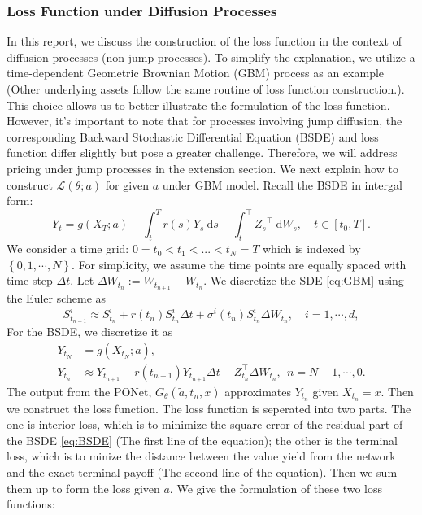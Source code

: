 \documentclass[11pt,a4paper]{article}
\theoremstyle{remark}
\begin{document}
	\subsubsection{Loss Function under Diffusion Processes}
	In this report, we discuss the construction of the loss function in the context of diffusion processes (non-jump processes). To simplify the explanation, we utilize a time-dependent Geometric Brownian Motion (GBM) process as an example (Other underlying assets follow the same routine of loss function construction.). This choice allows us to better illustrate the formulation of the loss function. However, it's important to note that for processes involving jump diffusion, the corresponding Backward Stochastic Differential Equation (BSDE) and loss function differ slightly but pose a greater challenge. Therefore, we will address pricing under jump processes in the extension section.
	We next explain how to construct $\mathcal{L}(\theta;a)$ for given $a$ under GBM model. Recall the BSDE in intergal form:
	\begin{equation}
		Y_t = g(X_T; a) - \int_t^T r(s) Y_s \mathrm{~d} s  - \int_t^{\top} {Z_s}^{\top} \mathrm{~d} W_s,\quad t\in[t_0,T].
	\end{equation}
	We consider a time grid: $0 = t_0 < t_1 < ... < t_{N}=T$ which is indexed by $\left\{0, 1, \cdots, N\right\}$. For simplicity, we assume the time points are equally spaced with time step $\Delta t$. Let $\Delta W_{t_n}:=W_{t_{n+1}}-W_{t_n}$. We discretize the SDE \eqref{eq:GBM} using the Euler scheme as
	\begin{equation}
		S_{t_{n+1}}^i \approx S_{t_n}^i + r(t_n) S_{t_n}^i \Delta t + \sigma^i(t_n) S_{t_n}^i\Delta W_{t_n},\quad i=1,\cdots,d, \label{eq:GBM-dist}
	\end{equation}
	For the BSDE, we discretize it as 
	\begin{align}\label{eq:dist-BSDE}
		Y_{t_N} & = g(X_{t_N}; a),  \\
		Y_{t_n} &\approx Y_{t_{n+1}} - r(t_{n+1}) Y_{t_{n+1}}\Delta t  -  Z_{t_n}^\top \Delta W_{t_n},\ \ n=N-1,\cdots,0. 
	\end{align}
	The output from the PONet, $G_\theta(\tilde{a},t_n,x)$ approximates $Y_{t_n}$ given $X_{t_n}=x$.  Then we construct the loss function. The loss function is seperated into two parts. The one is interior loss, which is to minimize the square error of the residual part of the BSDE \ref{eq:BSDE} (The first line of the equation); the other is the terminal loss, which is to minize the distance between the value yield from the network and the exact terminal payoff (The second line of the equation). Then we sum them up to form the loss given $a$. We give the formulation of these two loss functions:
\end{document}
